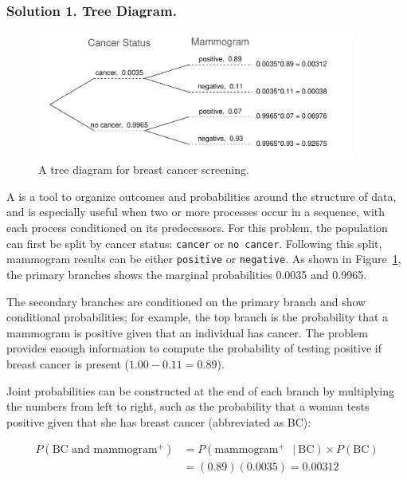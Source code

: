 \subsubsection{Solution 1. Tree Diagram.}

\begin{figure}[h]
	\centering
	\includegraphics[width=0.93\textwidth]{ch_probability_oi_biostat/figures/BreastCancerTreeDiagram/BreastCancerTreeDiagram}
	\caption{A tree diagram for breast cancer screening.}
	\label{BreastCancerTreeDiagram}
\end{figure}

A  is a tool to organize outcomes and probabilities around the structure of data, and is especially useful when two or more processes occur in a sequence, with each process  conditioned on its predecessors. For this problem, the population can first be split by cancer status: \texttt{cancer} or \texttt{no cancer}. Following this split, mammogram results can be either \texttt{positive} or \texttt{negative}. As shown in Figure~\ref{BreastCancerTreeDiagram}, the primary branches shows the marginal probabilities 0.0035 and 0.9965. 

The secondary branches are conditioned on the primary branch and show conditional probabilities; for example, the top branch is the probability that a mammogram is positive given that an individual has cancer. The problem provides enough information to compute the probability of testing positive if breast cancer is present ($1.00 - 0.11=0.89$). 

Joint probabilities can be constructed at the end of each branch by multiplying the numbers from left to right, such as the probability that a woman tests positive given that she has breast cancer (abbreviated as BC):

\begin{align*}
P(\text{BC and mammogram$^+$}) &= P(\text{mammogram$^+$ } |\ \text{BC}) \times  P(\text{BC}) \\
	&= (0.89) (0.0035) = 0.00312
\end{align*}

